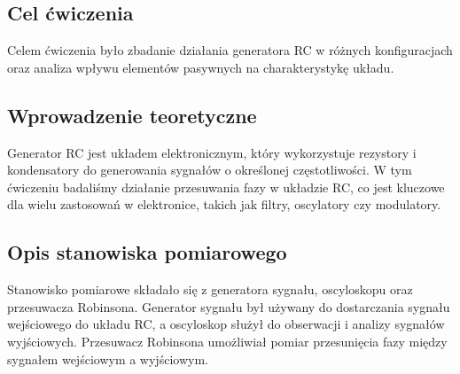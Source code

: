 \documentclass[11pt]{article}
\begin{document}
\subsection*{Cel ćwiczenia}
Celem ćwiczenia było zbadanie działania generatora RC w różnych konfiguracjach oraz analiza wpływu elementów pasywnych na charakterystykę układu.
\subsection*{Wprowadzenie teoretyczne}
Generator RC jest układem elektronicznym, który wykorzystuje rezystory i kondensatory do generowania sygnałów o określonej częstotliwości. W tym ćwiczeniu badaliśmy działanie przesuwania fazy w układzie RC,
 co jest kluczowe dla wielu zastosowań w elektronice, takich jak filtry, oscylatory czy modulatory.
\subsection*{Opis stanowiska pomiarowego}
Stanowisko pomiarowe składało się z generatora sygnału, oscyloskopu oraz przesuwacza Robinsona. Generator sygnału był używany do dostarczania sygnału wejściowego do układu RC, 
a oscyloskop służył do obserwacji i analizy sygnałów wyjściowych. Przesuwacz Robinsona umożliwiał pomiar przesunięcia fazy między sygnałem wejściowym a wyjściowym.
\clearpage
\end{document}
